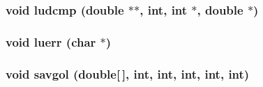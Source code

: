 \subsubsection{\setlength{\rightskip}{0pt plus 5cm}void ludcmp (double $\ast$$\ast$, int, int $\ast$, double $\ast$)}\label{clucode_8c_bfa5b802fb66183ef55ff29d5768d151}


\subsubsection{\setlength{\rightskip}{0pt plus 5cm}void luerr (char $\ast$)}\label{clucode_8c_e924dc2f3616b3832f33fd2b7732a8c6}


\subsubsection{\setlength{\rightskip}{0pt plus 5cm}void savgol (double[$\,$], int, int, int, int, int)}\label{clucode_8c_c46db294eb252c4ccc81922a6cd481e7}


